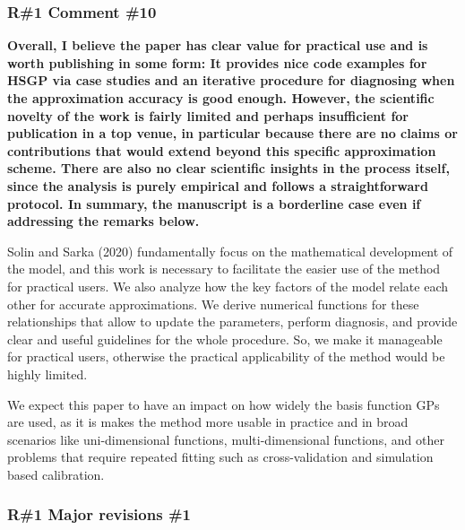 \documentclass[11pt]{report}
\begin{document}
\subsubsection*{R\#1 Comment \#10}

\textbf{Overall, I believe the paper has clear value for practical use and is worth publishing in some form: It provides nice code examples for HSGP via case studies and an iterative procedure for diagnosing when the approximation accuracy is good enough. However, the scientific novelty of the work is fairly limited and perhaps insufficient for publication in a top venue, in particular because there are no claims or contributions that would extend beyond this specific approximation scheme. There are also no clear scientific insights in the process itself, since the analysis is purely empirical and follows a straightforward protocol. In summary, the manuscript is a borderline case even if addressing the remarks below.}

Solin and Sarka (2020) fundamentally focus on the mathematical development of the model, and this work is necessary to facilitate the easier use of the method for practical users. We also analyze how the key factors of the model relate each other for accurate approximations. We derive numerical functions for these relationships that allow to update the parameters, perform diagnosis, and provide clear and useful guidelines for the whole procedure. So, we make it manageable for practical users, otherwise the practical applicability of the method would be highly limited.

We expect this paper to have an impact on how widely the basis function GPs are used, as it is makes the method more usable in practice and in broad scenarios like uni-dimensional functions, multi-dimensional functions, and other problems that require repeated fitting such as cross-validation and simulation based calibration.


\subsubsection*{R\#1 Major revisions \#1}
\end{document}
